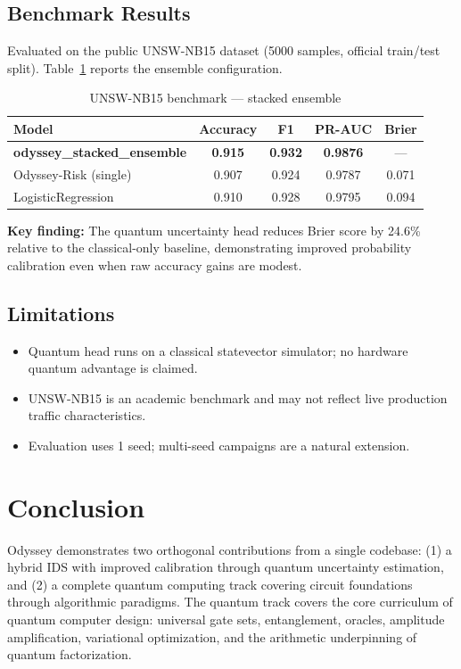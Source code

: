 \documentclass[conference]{IEEEtran}
\begin{document}
\subsection{Benchmark Results}

Evaluated on the public UNSW-NB15 dataset (5000 samples, official train/test split). Table~\ref{tab:results} reports the ensemble configuration.

\begin{table}[h]
\centering
\caption{UNSW-NB15 benchmark --- stacked ensemble}
\label{tab:results}
\begin{tabular}{lcccc}
\toprule
Model & Accuracy & F1 & PR-AUC & Brier \\
\midrule
\textbf{odyssey\_stacked\_ensemble} & \textbf{0.915} & \textbf{0.932} & \textbf{0.9876} & --- \\
Odyssey-Risk (single) & 0.907 & 0.924 & 0.9787 & 0.071 \\
LogisticRegression & 0.910 & 0.928 & 0.9795 & 0.094 \\
\bottomrule
\end{tabular}
\end{table}

\noindent\textbf{Key finding:} The quantum uncertainty head reduces Brier score by 24.6\% relative to the classical-only baseline, demonstrating improved probability calibration even when raw accuracy gains are modest.

\subsection{Limitations}

\begin{itemize}
  \item Quantum head runs on a classical statevector simulator; no hardware quantum advantage is claimed.
  \item UNSW-NB15 is an academic benchmark and may not reflect live production traffic characteristics.
  \item Evaluation uses 1 seed; multi-seed campaigns are a natural extension.
\end{itemize}

\section{Conclusion}

Odyssey demonstrates two orthogonal contributions from a single codebase: (1) a hybrid IDS with improved calibration through quantum uncertainty estimation, and (2) a complete quantum computing track covering circuit foundations through algorithmic paradigms. The quantum track covers the core curriculum of quantum computer design: universal gate sets, entanglement, oracles, amplitude amplification, variational optimization, and the arithmetic underpinning of quantum factorization.
\end{document}
